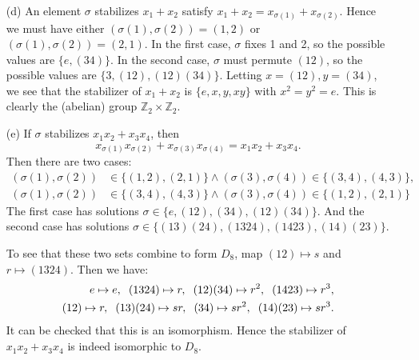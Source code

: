 \documentclass[12pt]{article}
\theoremstyle{remark}
\theoremstyle{named}
\begin{document}
\begin{enumerate}
\begin{enumerate}
        \item[(d)] An element \(\sigma\) stabilizes \(x_1 + x_2\) satisfy \(x_1 + x_2 = x_{\sigma(1)} + x_{\sigma(2)}\). Hence we must have either \((\sigma(1), \sigma(2)) = (1, 2)\) or \((\sigma(1), \sigma(2)) = (2, 1)\). In the first case, \(\sigma\) fixes 1 and 2, so the possible values are \(\{e, (34)\}\). 
        In the second case, \(\sigma\) must permute \((12)\), so the possible values are \(\{3, (12), (12)(34)\}\). Letting \(x = (12), y = (34)\), we see that the stabilizer of \(x_1+ x_2\) is \(\{e, x, y, xy\}\) with \(x^2 = y^2 = e\). This is clearly the (abelian) group \(\mathbb Z_2 \times \mathbb Z_2\). 

        \item[(e)] If \(\sigma\) stabilizes \(x_1 x_2 + x_3 x_4\), then 
        \[x_{\sigma(1)}x_{\sigma(2)} + x_{\sigma(3)} x_{\sigma(4)} = x_1 x_2 + x_3 x_4.\]
        Then there are two cases:
        \begin{align*}
            (\sigma(1), \sigma(2)) &\in \{(1, 2), (2, 1)\} \land (\sigma(3), \sigma(4)) \in \{(3, 4), (4, 3)\}, \\
            (\sigma(1), \sigma(2)) &\in \{(3, 4), (4, 3)\} \land (\sigma(3), \sigma(4)) \in \{(1, 2), (2, 1)\}
        \end{align*}
        The first case has solutions \(\sigma \in \{e, (12), (34), (12)(34)\}\). And the second case has solutions \(\sigma \in \{(13)(24), (1324), (1423), (14)(23)\}\). 

        To see that these two sets combine to form \(D_8\), map \((12) \mapsto s\) and \(r \mapsto (1324)\). Then we have:
        \begin{align*}
            e \mapsto e, \hspace{2mm} (1324) \mapsto r, \hspace{2mm} (12)(34) \mapsto r^2, \hspace{2mm} (1423) \mapsto r^3, \\ 
            (12) \mapsto r, \hspace{2mm} (13)(24) \mapsto sr, \hspace{2mm} (34) \mapsto sr^2, \hspace{2mm} (14)(23) \mapsto sr^3.
        \end{align*}
        It can be checked that this is an isomorphism. Hence the stabilizer of \(x_1 x_2 + x_3 x_4\) is indeed isomorphic to \(D_8\).


\end{enumerate}
\end{enumerate}
\end{document}
